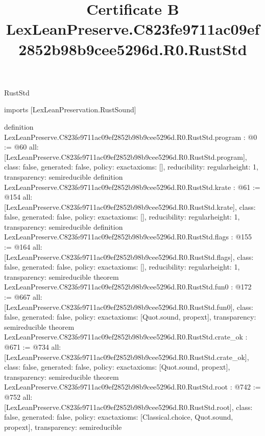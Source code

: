 \begin{lexlean}{RustStd}
\title{Certificate B LexLeanPreserve.C823fe9711ac09ef2852b98b9cee5296d.R0.RustStd}
\begin{coremodule}
imports [LexLeanPreservation.RustSound]

definition LexLeanPreserve.C823fe9711ac09ef2852b98b9cee5296d.R0.RustStd.program : @0 := @60 {
  all: [LexLeanPreserve.C823fe9711ac09ef2852b98b9cee5296d.R0.RustStd.program],
  class: false,
  generated: false,
  policy: exact{axioms: []},
  reducibility: regular{height: 1},
  transparency: semireducible
}
definition LexLeanPreserve.C823fe9711ac09ef2852b98b9cee5296d.R0.RustStd.krate : @61 := @154 {
  all: [LexLeanPreserve.C823fe9711ac09ef2852b98b9cee5296d.R0.RustStd.krate],
  class: false,
  generated: false,
  policy: exact{axioms: []},
  reducibility: regular{height: 1},
  transparency: semireducible
}
definition LexLeanPreserve.C823fe9711ac09ef2852b98b9cee5296d.R0.RustStd.flags : @155 := @164 {
  all: [LexLeanPreserve.C823fe9711ac09ef2852b98b9cee5296d.R0.RustStd.flags],
  class: false,
  generated: false,
  policy: exact{axioms: []},
  reducibility: regular{height: 1},
  transparency: semireducible
}
theorem LexLeanPreserve.C823fe9711ac09ef2852b98b9cee5296d.R0.RustStd.fun0 : @172 := @667 {
  all: [LexLeanPreserve.C823fe9711ac09ef2852b98b9cee5296d.R0.RustStd.fun0],
  class: false,
  generated: false,
  policy: exact{axioms: [Quot.sound, propext]},
  transparency: semireducible
}
theorem LexLeanPreserve.C823fe9711ac09ef2852b98b9cee5296d.R0.RustStd.crate_ok : @671 := @734 {
  all: [LexLeanPreserve.C823fe9711ac09ef2852b98b9cee5296d.R0.RustStd.crate_ok],
  class: false,
  generated: false,
  policy: exact{axioms: [Quot.sound, propext]},
  transparency: semireducible
}
theorem LexLeanPreserve.C823fe9711ac09ef2852b98b9cee5296d.R0.RustStd.root : @742 := @752 {
  all: [LexLeanPreserve.C823fe9711ac09ef2852b98b9cee5296d.R0.RustStd.root],
  class: false,
  generated: false,
  policy: exact{axioms: [Classical.choice, Quot.sound, propext]},
  transparency: semireducible
}


\end{coremodule}
\end{lexlean}
